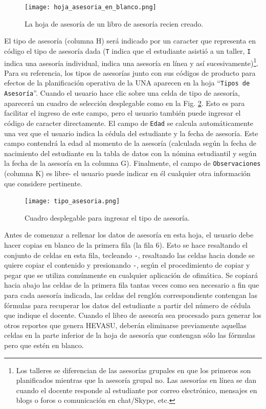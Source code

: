 \documentclass[letterpaper,12pt]{book}
\begin{document}
\begin{figure}[!hb]
  \centering
  \texttt{[image: hoja\_asesoria\_en\_blanco.png]}
  \caption{La hoja de asesoría de un libro de asesoría recien creado.}
  \label{fig:hoja_asesoria_en_blanco}
\end{figure}

El tipo de asesoría (columna H) será indicado por un caracter que representa en código el tipo de asesoría dada (\texttt{T} indica que el estudiante asistió a un taller, \texttt{I} indica una asesoría individual, \texttt{\@} indica una asesoría en línea y así sucesivamente)\footnote{Los talleres se diferencian de las asesorías grupales en que los primeros son planificados mientras que la asesoría grupal no. Las asesorías en línea se dan cuando el docente responde al estudiante por correo electrónico, mensajes en blogs o foros o comunicación en chat/Skype, etc.}.  Para su referencia, los tipos de asesorías junto con sus códigos de producto para efectos de la planificación operativa de la UNA aparecen en la hoja ``\texttt{Tipos de Asesoría}''. Cuando el usuario hace clic sobre una celda de tipo de asesoría, aparecerá un cuadro de selección desplegable como en la Fig. \ref{fig:tipo_asesoria}. Esto es para facilitar el ingreso de este campo, pero el usuario también puede ingresar el código de caracter directamente. El campo de \texttt{Edad} se calcula automáticamente una vez que el usuario indica la cédula del estudiante y la fecha de asesoría. Este campo contendrá la edad al momento de la asesoría (calculada según la fecha de nacimiento del estudiante en la tabla de datos con la nómina estudiantil y según la fecha de la asesoría en la columna G). Finalmente, el campo de \texttt{Observaciones} (columna K) es libre- el usuario puede indicar en él cualquier otra información que considere pertinente.

\begin{figure}[!ht]
  \centering
  \texttt{[image: tipo\_asesoria.png]}
  \caption{Cuadro desplegable para ingresar el tipo de asesoría.}
  \label{fig:tipo_asesoria}
\end{figure}

Antes de comenzar a rellenar los datos de asesoría en esta hoja, el usuario debe hacer copias en blanco de la primera fila (la fila 6). Esto se hace resaltando el conjunto de celdas en esta fila, tecleando \texttt{-}, resaltando las celdas hacia donde se quiere copiar el contenido y presionando \texttt{-}, según el procedimiento de copiar y pegar que se utiliza comúnmente en cualquier aplicación de ofimática. Se copiará hacia abajo las celdas de la primera fila tantas veces como sea necesario a fin que para cada asesoría indicada, las celdas del renglón correspondiente contengan las fórmulas para recuperar los datos del estudiante a partir del número de cédula que indique el docente.  Cuando el libro de asesoría sea procesado para generar los otros reportes que genera HEVASU, deberán eliminarse previamente aquellas celdas en la parte inferior de la hoja de asesoría que contengan sólo las fórmulas pero que estén en blanco.
\end{document}
